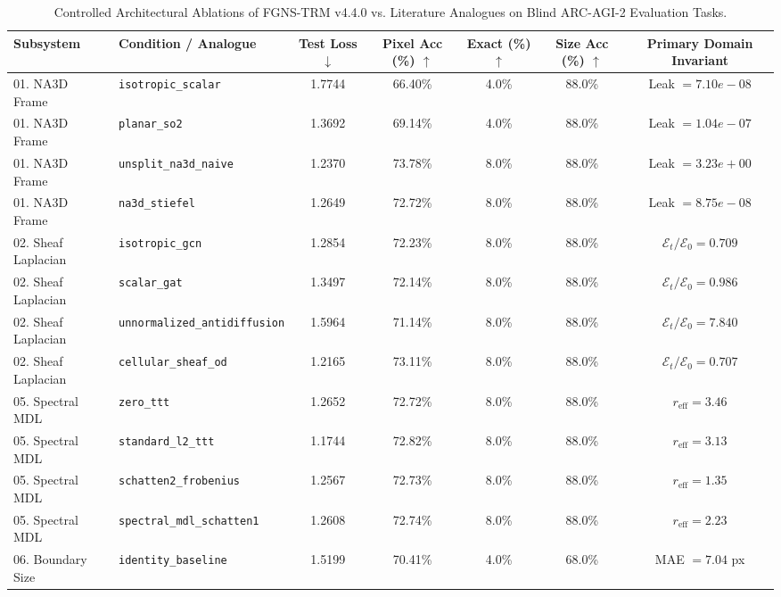 \begin{table}[t]
\centering
\small
\caption{Controlled Architectural Ablations of FGNS-TRM v4.4.0 vs. Literature Analogues on Blind ARC-AGI-2 Evaluation Tasks.}
\label{tab:fgns_ablations}
\begin{tabular}{llccccc}
\toprule
\textbf{Subsystem} & \textbf{Condition / Analogue} & \textbf{Test Loss $\downarrow$} & \textbf{Pixel Acc (\%) $\uparrow$} & \textbf{Exact (\%) $\uparrow$} & \textbf{Size Acc (\%) $\uparrow$} & \textbf{Primary Domain Invariant} \\
\midrule
01. NA3D Frame & \texttt{isotropic\_scalar} & 1.7744 & 66.40\% & 4.0\% & 88.0\% & Leak $=7.10e-08$ \\
01. NA3D Frame & \texttt{planar\_so2} & 1.3692 & 69.14\% & 4.0\% & 88.0\% & Leak $=1.04e-07$ \\
01. NA3D Frame & \texttt{unsplit\_na3d\_naive} & 1.2370 & 73.78\% & 8.0\% & 88.0\% & Leak $=3.23e+00$ \\
01. NA3D Frame & \texttt{na3d\_stiefel} & 1.2649 & 72.72\% & 8.0\% & 88.0\% & Leak $=8.75e-08$ \\
\midrule
02. Sheaf Laplacian & \texttt{isotropic\_gcn} & 1.2854 & 72.23\% & 8.0\% & 88.0\% & $\mathcal{E}_t/\mathcal{E}_0=0.709$ \\
02. Sheaf Laplacian & \texttt{scalar\_gat} & 1.3497 & 72.14\% & 8.0\% & 88.0\% & $\mathcal{E}_t/\mathcal{E}_0=0.986$ \\
02. Sheaf Laplacian & \texttt{unnormalized\_antidiffusion} & 1.5964 & 71.14\% & 8.0\% & 88.0\% & $\mathcal{E}_t/\mathcal{E}_0=7.840$ \\
02. Sheaf Laplacian & \texttt{cellular\_sheaf\_od} & 1.2165 & 73.11\% & 8.0\% & 88.0\% & $\mathcal{E}_t/\mathcal{E}_0=0.707$ \\
\midrule
05. Spectral MDL & \texttt{zero\_ttt} & 1.2652 & 72.72\% & 8.0\% & 88.0\% & $r_{\text{eff}}=3.46$ \\
05. Spectral MDL & \texttt{standard\_l2\_ttt} & 1.1744 & 72.82\% & 8.0\% & 88.0\% & $r_{\text{eff}}=3.13$ \\
05. Spectral MDL & \texttt{schatten2\_frobenius} & 1.2567 & 72.73\% & 8.0\% & 88.0\% & $r_{\text{eff}}=1.35$ \\
05. Spectral MDL & \texttt{spectral\_mdl\_schatten1} & 1.2608 & 72.74\% & 8.0\% & 88.0\% & $r_{\text{eff}}=2.23$ \\
\midrule
06. Boundary Size & \texttt{identity\_baseline} & 1.5199 & 70.41\% & 4.0\% & 68.0\% & MAE $=7.04$ px \\

\end{tabular}
\end{table}
